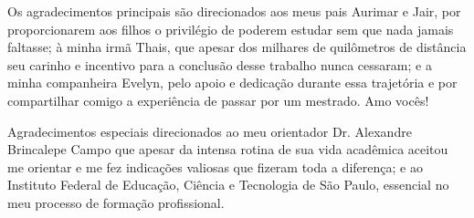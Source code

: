 \begin{agradecimentos}


Os agradecimentos principais são direcionados aos meus pais Aurimar e Jair,
por proporcionarem aos filhos o privilégio de poderem estudar sem que nada jamais
faltasse; à minha irmã Thais, que apesar dos milhares de quilômetros de distância
seu carinho e incentivo para a conclusão desse trabalho nunca cessaram; e a minha
companheira Evelyn, pelo apoio e dedicação durante essa trajetória e por compartilhar
comigo a experiência de passar por um mestrado. Amo vocês!

Agradecimentos especiais direcionados ao meu orientador Dr. Alexandre Brincalepe Campo
que apesar da intensa rotina de sua vida acadêmica aceitou me orientar e me fez indicações
valiosas que fizeram toda a diferença; e ao Instituto Federal de Educação, Ciência e
Tecnologia de São Paulo, essencial no meu processo de formação profissional.

\end{agradecimentos}